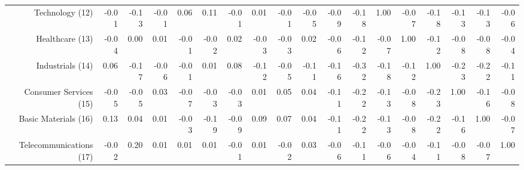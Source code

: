 \begin{sidewaystable}
{\begin{tabular}{rrrrrrrrrrrrrrrrrr}
Technology (12)         & -0.01 & -0.13 & -0.01 & 0.06  & 0.11  & -0.01 & 0.01  & -0.01 & -0.05 & -0.09 & -0.18 & 1.00  & -0.07 & -0.18 & -0.13 & -0.13 & -0.06 \\
Healthcare (13)         & -0.04 & 0.00  & 0.01  & -0.01 & -0.02 & 0.02  & -0.03 & -0.03 & 0.02  & -0.06 & -0.12 & -0.07 & 1.00  & -0.12 & -0.08 & -0.08 & -0.04 \\
Industrials (14)        & 0.06  & -0.17 & -0.06 & -0.01 & 0.01  & 0.08  & -0.12 & -0.05 & -0.11 & -0.16 & -0.32 & -0.18 & -0.12 & 1.00  & -0.23 & -0.22 & -0.11 \\
Consumer Services (15)  & -0.05 & -0.05 & 0.03  & -0.07 & -0.03 & -0.03 & 0.01  & 0.05  & 0.04  & -0.11 & -0.22 & -0.13 & -0.08 & -0.23 & 1.00  & -0.16 & -0.08 \\
Basic Materials (16)    & 0.13  & 0.04  & 0.01  & -0.03 & -0.19 & -0.09 & 0.09  & 0.07  & 0.04  & -0.11 & -0.22 & -0.13 & -0.08 & -0.22 & -0.16 & 1.00  & -0.07 \\
Telecommunications (17) & -0.02 & 0.20  & 0.01  & 0.01  & 0.01  & -0.01 & 0.01  & -0.02 & 0.03  & -0.06 & -0.11 & -0.06 & -0.04 & -0.11 & -0.08 & -0.07 & 1.00             \\ 
   \bottomrule
\end{tabular}}
\end{sidewaystable}

